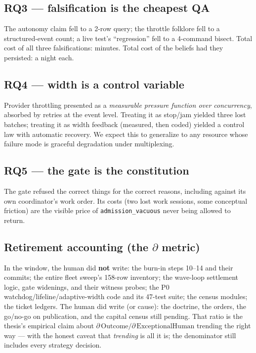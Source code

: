 \documentclass[11pt,a4paper]{article}
\theoremstyle{remark}
\newcommand{\term}[1]{\texttt{#1}}
\begin{document}
\subsection{RQ3 --- falsification is the cheapest QA}
The autonomy claim fell to a 2-row query; the throttle folklore fell to a structured-event count; a live test's ``regression'' fell to a 4-command bisect. Total cost of all three falsifications: minutes. Total cost of the beliefs had they persisted: a night each.

\subsection{RQ4 --- width is a control variable}
Provider throttling presented as a \emph{measurable pressure function over concurrency}, absorbed by retries at the event level. Treating it as stop/jam yielded three lost batches; treating it as width feedback (measured, then coded) yielded a control law with automatic recovery. We expect this to generalize to any resource whose failure mode is graceful degradation under multiplexing.

\subsection{RQ5 --- the gate is the constitution}
The gate refused the correct things for the correct reasons, including against its own coordinator's work order. Its costs (two lost work sessions, some conceptual friction) are the visible price of \term{admission\_vacuous} never being allowed to return.

\subsection{Retirement accounting (the $\partial$ metric)}
In the window, the human did \textbf{not} write: the burn-in steps 10--14 and their commits; the entire fleet sweep's 158-row inventory; the wave-loop settlement logic, gate widenings, and their witness probes; the P0 watchdog/lifeline/adaptive-width code and its 47-test suite; the census modules; the ticket ledgers. The human did write (or cause): the doctrine, the orders, the go/no-go on publication, and the capital census still pending. That ratio is the thesis's empirical claim about $\partial\,\mathrm{Outcome}/\partial\,\mathrm{ExceptionalHuman}$ trending the right way --- with the honest caveat that \emph{trending} is all it is; the denominator still includes every strategy decision.
\end{document}
